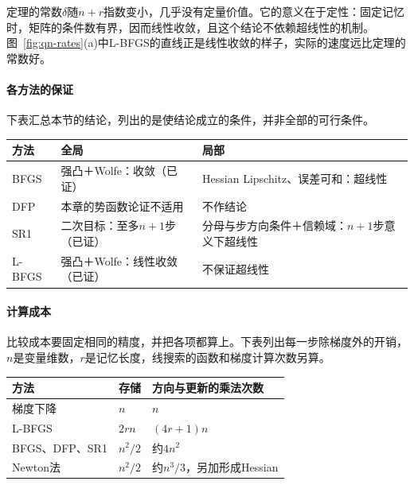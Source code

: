 定理的常数$\delta$随$n+r$指数变小，几乎没有定量价值。它的意义在于定性：固定记忆时，矩阵的条件数有界，因而线性收敛，且这个结论不依赖超线性的机制。图~\ref{fig:qn-rates}(a)中L-BFGS的直线正是线性收敛的样子，实际的速度远比定理的常数好。

\paragraph{各方法的保证}
下表汇总本节的结论，列出的是使结论成立的条件，并非全部的可行条件。

\begin{BookInlineTable}
  \centering
  \small
  \begin{tabular}{p{15mm}p{39mm}p{39mm}}
    \toprule
    方法 & 全局 & 局部\\
    \midrule
    BFGS & 强凸＋Wolfe：收敛（已证） & Hessian Lipschitz、误差可和：超线性\\
    DFP & 本章的势函数论证不适用 & 不作结论\\
    SR1 & 二次目标：至多$n+1$步（已证） & 分母与步方向条件＋信赖域：$n+1$步意义下超线性\\
    L-BFGS & 强凸＋Wolfe：线性收敛（已证） & 不保证超线性\\
    \bottomrule
  \end{tabular}
  \caption{拟牛顿方法的收敛保证汇总。}
  \label{tab:qn-guarantees}
\end{BookInlineTable}

\paragraph{计算成本}
比较成本要固定相同的精度，并把各项都算上。下表列出每一步除梯度外的开销，$n$是变量维数，$r$是记忆长度，线搜索的函数和梯度计算次数另算。

\begin{BookInlineTable}
  \centering
  \begin{tabular}{lll}
    \toprule
    方法 & 存储 & 方向与更新的乘法次数\\
    \midrule
    梯度下降 & $n$ & $n$\\
    L-BFGS & $2rn$ & $(4r+1)n$\\
    BFGS、DFP、SR1 & $n^2/2$ & 约$4n^2$\\
    Newton法 & $n^2/2$ & 约$n^3/3$，另加形成Hessian\\
    \bottomrule
  \end{tabular}
  \caption{每步除梯度以外的存储与运算，Newton法按Cholesky分解计。}
  \label{tab:qn-cost}
\end{BookInlineTable}

